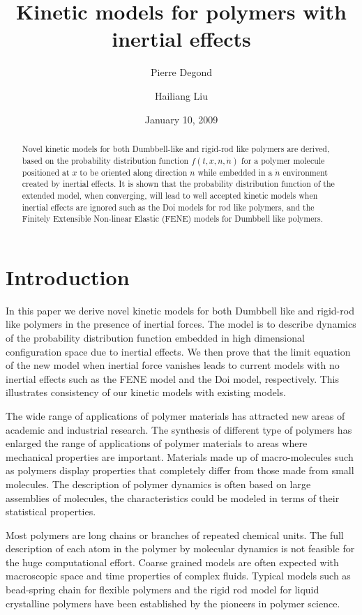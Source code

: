 \documentclass[reqno]{amsart}
\author{ Pierre Degond}
\author{Hailiang Liu}
\title[]{Kinetic models for polymers with inertial effects}
\date{January 10, 2009}
\numberwithin{equation}{section}
\theoremstyle{definition}
\theoremstyle{remark}
\begin{document}
\begin{abstract}
Novel kinetic models for both Dumbbell-like and rigid-rod like
polymers are derived, based on the probability distribution function
$f(t, x, n, \dot n)$ for a polymer molecule positioned at $x$ to be
oriented along direction $n$ while embedded in a $\dot n$
environment created by inertial effects. It is shown that the
probability distribution function of the extended model, when
converging, will lead to well accepted kinetic models when inertial
effects are ignored such as the Doi models for rod like polymers,
and the Finitely Extensible Non-linear Elastic (FENE) models for
Dumbbell like polymers.
\end{abstract}
\maketitle
\tableofcontents

\section{Introduction}

In this paper we derive novel kinetic models for both Dumbbell like
and rigid-rod like polymers in the presence of inertial forces. The
model is to describe dynamics of the probability distribution
function embedded in high dimensional configuration space due to
inertial effects. We then prove that the limit equation of the new
model when inertial force vanishes leads to current models with no
inertial effects such as the FENE model and the Doi model,
respectively. This illustrates consistency of our kinetic models
with existing models.

The wide range of applications of polymer materials has attracted
new areas of academic and industrial research. The synthesis of
different type of polymers has enlarged the range of applications of
polymer materials to areas where mechanical properties are
important. Materials made up of macro-molecules such as polymers
display properties that completely differ from those made from
small molecules. The description of polymer dynamics is often based
on large assemblies of molecules, the characteristics could be modeled
in terms of their statistical properties.

Most polymers are long chains or branches of repeated chemical
units. The full description of each atom in the polymer by molecular
dynamics is not feasible for the huge computational effort. Coarse
grained models are often expected with macroscopic space and time
properties of complex fluids. Typical models such as bead-spring
chain for flexible polymers and the rigid rod model for liquid
crystalline polymers have been established by the pioneers in
polymer science.
\end{document}
